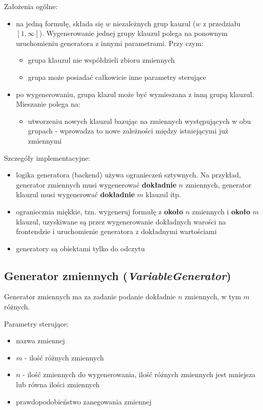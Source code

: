 \documentclass[a4paper,12pt]{article}
\begin{document}
\noindent
Założenia ogólne:
\begin{itemize}
  \item na jedną formułę, składa się $w$ niezależnych grup kauzul ($w$ z przedziału $[1, \infty]$). Wygenerowanie jednej grupy klauzul polega na ponownym uruchomieniu generatora z innymi parametrami. Przy czym:
    \begin{itemize}
      \item grupa klauzul nie współdzieli zbioru zmiennych
      \item grupa może posiadać całkowicie inne parametry sterujące
    \end{itemize}
  \item po wygenerowaniu, grupa klazul może być wymieszana z inną grupą klauzul. Mieszanie polega na:
    \begin{itemize}
      \item utworzeniu nowych klauzul bazując na zmiennych występujących w obu grupach - wprowadza to nowe zależności między istniejącymi już zmiennymi
    \end{itemize}
\end{itemize}

\noindent
Szczegóły implementacyjne:
\begin{itemize}
  \item logika generatora (backend) używa ogranieczeń sztywnych. Na przykład, generator zmiennych musi wygenerować \textbf{dokładnie} $n$ zmiennych, generator klauzul musi wygenerować \textbf{dokładnie} $m$ klauzul itp.
  \item ograniecznia miękkie, tzn. wygeneruj formułę z \textbf{około} $n$ zmiennych i \textbf{około} $m$ klauzul, uzyskiwane są przez wygenerowanie dokładnych warości na frontendzie i uruchomienie generatora z dokładnymi wartościami
  \item generatory są obiektami tylko do odczytu
\end{itemize}

\subsection{Generator zmiennych (\textit{VariableGenerator})}

Generator zmiennych ma za zadanie podanie dokładnie $n$ zmiennych, w tym $m$ różnych.

\noindent
Parametry sterujące:

\begin{itemize}
  \item nazwa zmiennej
  \item $m$ - ilość różnych zmiennych
  \item $n$ - ilość zmiennych do wygenerowania, ilość różnych zmiennych jest mniejsza lub równa ilości zmiennych
  \item prawdopodobieństwo zanegowania zmiennej
\end{itemize}
\end{document}
